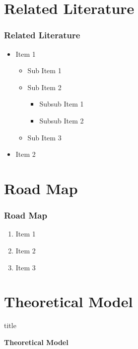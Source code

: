 \documentclass[11pt]{beamer}
\begin{document}
\section[Literature]{Related Literature}
\begin{frame}
	\frametitle{\bfseries Related Literature}
	
	\begin{itemize}
		\item Item 1
		
		\begin{itemize}
			\item Sub Item 1
			\item Sub Item 2
					
			\begin{itemize}
				\item Subsub Item 1
				\item Subsub Item 2
			\end{itemize}
			\item Sub Item 3
		\end{itemize}
		\item Item 2

	\end{itemize}

\end{frame}

\section{Road Map}
\begin{frame}

	\frametitle{\bfseries Road Map}
	
	\begin{enumerate}
		\item Item 1
		\item Item 2
		\item Item 3
	\end{enumerate}
\end{frame}

\section[Theoretical]{Theoretical Model}
\begin{frame}
	\begin{beamercolorbox}{title}
		\begin{center}
			\bfseries \huge Theoretical Model
		\end{center}
	\end{beamercolorbox}

\end{frame}
\end{document}

